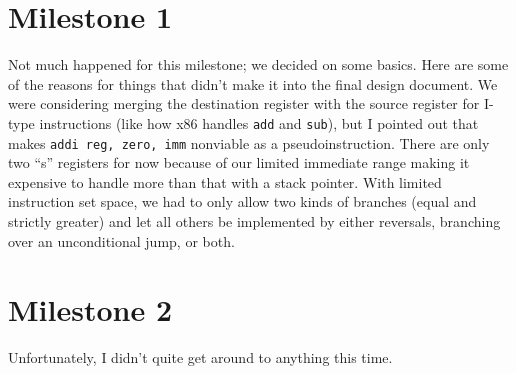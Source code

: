 \documentclass{report}
\begin{document}
\chapter{Milestone 1}
Not much happened for this milestone; we decided on some basics.
Here are some of the reasons for things that didn't make it into the final design document.
We were considering merging the destination register with the source register for I-type instructions (like how x86 handles \texttt{add} and \texttt{sub}), but I pointed out that makes \texttt{addi reg, zero, imm} nonviable as a pseudoinstruction.
There are only two ``s'' registers for now because of our limited immediate range making it expensive to handle more than that with a stack pointer.
With limited instruction set space, we had to only allow two kinds of branches (equal and strictly greater) and let all others be implemented by either reversals, branching over an unconditional jump, or both.
\chapter{Milestone 2}
Unfortunately, I didn't quite get around to anything this time.
\end{document}

